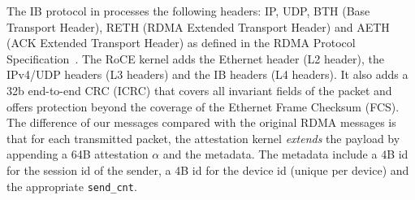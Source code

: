  The IB protocol in \projecttitle{} processes the following headers: IP, UDP, BTH (Base Transport Header), RETH (RDMA Extended Transport Header) and AETH (ACK Extended Transport Header) as defined in the RDMA Protocol Specification~\cite{rdma_specification, storm}.  The RoCE kernel adds the Ethernet header (L2 header), the IPv4/UDP headers (L3 headers) and the IB headers (L4 headers). It also adds a 32b end-to-end CRC (ICRC) that covers all invariant fields of the packet and offers protection beyond the coverage of the Ethernet Frame Checksum (FCS). The difference of our \projecttitle{} messages compared with the original RDMA messages is that for each transmitted packet, the attestation kernel {\em extends} the payload by appending a 64B attestation $\alpha$ and the metadata. The metadata include a 4B id for the session id of the sender, a 4B id for the device id (unique per device) and the appropriate {\tt send\_cnt}. %



